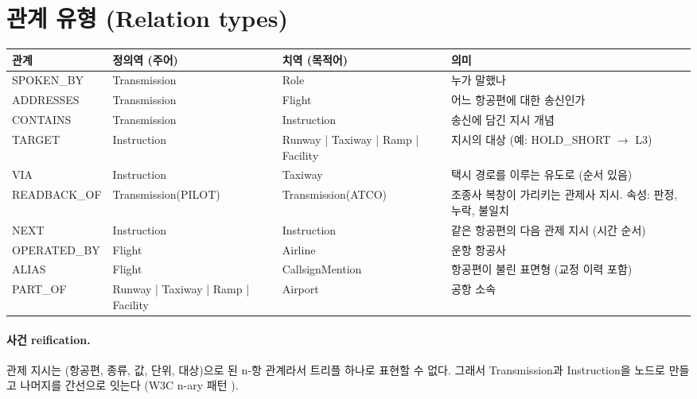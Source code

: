 \documentclass[10pt,a4paper]{article}
\newcommand{\cmd}[1]{\textsf{\small #1}}
\begin{document}
\section{관계 유형 (Relation types)}
\begin{center}\small
\begin{tabularx}{\textwidth}{@{}>{\ttfamily}l >{\raggedright\arraybackslash}p{2.7cm} >{\raggedright\arraybackslash}p{3.1cm} >{\raggedright\arraybackslash}X@{}}
\toprule
\normalfont 관계 & 정의역 (주어) & 치역 (목적어) & 의미\\\midrule
SPOKEN\_BY & Transmission & Role & 누가 말했나\\
ADDRESSES & Transmission & Flight & 어느 항공편에 대한 송신인가\\
CONTAINS & Transmission & Instruction & 송신에 담긴 지시 개념\\
TARGET & Instruction & Runway | Taxiway | Ramp | Facility & 지시의 대상 (예: HOLD\_SHORT $\to$ L3)\\
VIA & Instruction & Taxiway & 택시 경로를 이루는 유도로 (순서 있음)\\
READBACK\_OF & Transmission(PILOT) & Transmission(ATCO) & 조종사 복창이 가리키는 관제사 지시. 속성: 판정, 누락, 불일치\\
NEXT & Instruction & Instruction & 같은 항공편의 다음 관제 지시 (시간 순서)\\
OPERATED\_BY & Flight & Airline & 운항 항공사\\
ALIAS & Flight & CallsignMention & 항공편이 불린 표면형 (교정 이력 포함)\\
PART\_OF & Runway | Taxiway | Ramp | Facility & Airport & 공항 소속\\
\bottomrule
\end{tabularx}
\end{center}

\paragraph{사건 reification.} 관제 지시는 (항공편, 종류, 값, 단위, 대상)으로 된 n-항 관계라서 트리플 하나로 표현할 수 없다. 그래서 \cmd{Transmission}과 \cmd{Instruction}을 노드로 만들고 나머지를 간선으로 잇는다 (W3C n-ary 패턴 \cite{naryw3c}).

\end{document}
